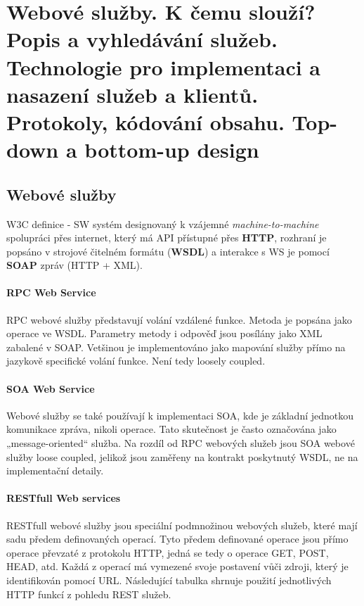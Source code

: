 \section[AOS - WS]{Webové služby. K čemu slouží? Popis a vyhledávání služeb. Technologie pro implementaci a nasazení služeb a klientů. Protokoly, kódování obsahu. Top-down a bottom-up design}

\subsection{Webové služby}
W3C definice - SW systém designovaný k vzájemné \textit{machine-to-machine} spolupráci přes internet, který má API přístupné přes \textbf{HTTP}, rozhraní je popsáno v strojové čitelném formátu (\textbf{WSDL}) a interakce s WS je pomocí \textbf{SOAP}  zpráv (HTTP + XML).

\paragraph{RPC Web Service} RPC webové služby představují volání vzdálené funkce. Metoda je popsána jako operace ve WSDL. Parametry metody i odpověď jsou posílány jako XML zabalené v SOAP. Vetšinou je implementováno jako mapování služby přímo na jazykově specifické volání funkce. Není tedy loosely coupled.

\paragraph{SOA Web Service} Webové služby se také používají k implementaci SOA, kde je základní jednotkou komunikace zpráva, nikoli operace. Tato skutečnost je často označována jako „message-oriented“ služba.
Na rozdíl od RPC webových služeb jsou SOA webové služby loose coupled, jelikož jsou zaměřeny na kontrakt poskytnutý WSDL, ne na implementační detaily.

\paragraph{RESTfull Web services} RESTfull webové služby jsou speciální podmnožinou webových služeb, které mají sadu předem definovaných operací. Tyto předem definované operace jsou přímo operace převzaté z protokolu HTTP, jedná se tedy o operace GET, POST, HEAD, atd. Každá z operací má vymezené svoje postavení vůči zdroji, který je identifikován pomocí URL. Následující tabulka shrnuje použití jednotlivých HTTP funkcí z pohledu REST služeb.

